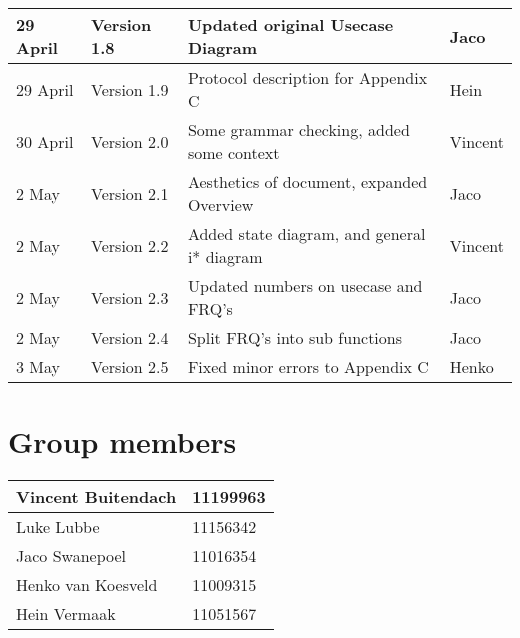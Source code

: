 \begin{center}
\begin{tabular}{|l|l|l|l|}
\hline
29 April & Version 1.8 & Updated original Usecase Diagram& Jaco\\
\hline
29 April & Version 1.9 & Protocol description for Appendix C& Hein\\
\hline
30 April & Version 2.0 & Some grammar checking, added some context & Vincent\\
\hline
2 May & Version 2.1 & Aesthetics of document, expanded Overview& Jaco\\
\hline
2 May & Version 2.2 & Added state diagram, and general i* diagram & Vincent\\
\hline
2 May & Version 2.3 & Updated numbers on usecase and FRQ's & Jaco\\
\hline
2 May & Version 2.4 & Split FRQ's into sub functions& Jaco\\
\hline
3 May & Version 2.5 & Fixed minor errors to Appendix C& Henko\\
\hline
\end{tabular}

\vfill
\section{Group members}

\begin{tabular}{|l|l|}

\hline
Vincent Buitendach & 11199963\\
\hline
Luke Lubbe & 11156342\\
\hline
Jaco Swanepoel & 11016354\\
\hline
Henko van Koesveld & 11009315\\
\hline
Hein Vermaak & 11051567\\
\hline

\end{tabular}

\end{center}

